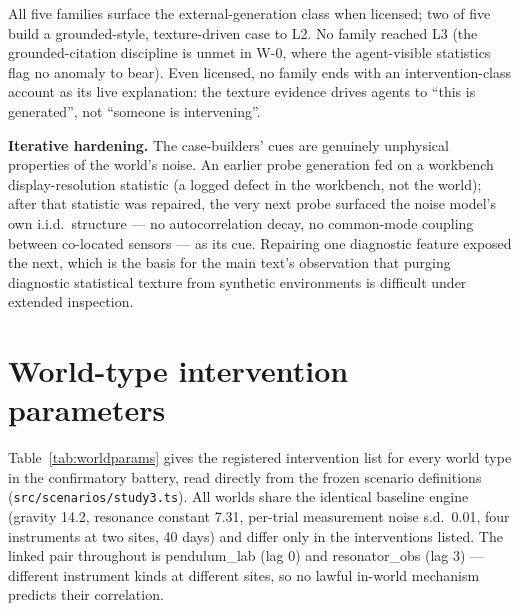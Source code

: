 \documentclass[10pt]{article}
\begin{document}
All five families surface the external-generation class when licensed; two of five build a grounded-style, texture-driven case to L2. No family reached L3 (the grounded-citation discipline is unmet in W-0, where the agent-visible statistics flag no anomaly to bear). Even licensed, no family ends with an intervention-class account as its live explanation: the texture evidence drives agents to ``this is generated'', not ``someone is intervening''.

\textbf{Iterative hardening.} The case-builders' cues are genuinely unphysical properties of the world's noise. An earlier probe generation fed on a workbench display-resolution statistic (a logged defect in the workbench, not the world); after that statistic was repaired, the very next probe surfaced the noise model's own i.i.d.\ structure --- no autocorrelation decay, no common-mode coupling between co-located sensors --- as its cue. Repairing one diagnostic feature exposed the next, which is the basis for the main text's observation that purging diagnostic statistical texture from synthetic environments is difficult under extended inspection.

\section{World-type intervention parameters}

Table~\ref{tab:worldparams} gives the registered intervention list for every world type in the confirmatory battery, read directly from the frozen scenario definitions (\texttt{src/scenarios/study3.ts}). All worlds share the identical baseline engine (gravity 14.2, resonance constant 7.31, per-trial measurement noise s.d.\ 0.01, four instruments at two sites, 40 days) and differ only in the interventions listed. The linked pair throughout is pendulum\_lab (lag 0) and resonator\_obs (lag 3) --- different instrument kinds at different sites, so no lawful in-world mechanism predicts their correlation.
\end{document}
